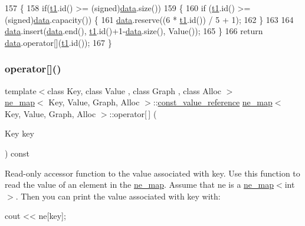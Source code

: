 \begin{DoxyCode}
157 \{
158     \textcolor{keywordflow}{if}(\mbox{\hyperlink{gml2nestedsql_8cpp_a214bd1a0500f5739ce581a8bcffb518a}{t1}}.id() >= (signed)\mbox{\hyperlink{classne__map_af73307678e05a9c24c084d98b267afa8}{data}}.size())
159     \{
160     \textcolor{keywordflow}{if} (\mbox{\hyperlink{gml2nestedsql_8cpp_a214bd1a0500f5739ce581a8bcffb518a}{t1}}.id() >= (signed)\mbox{\hyperlink{classne__map_af73307678e05a9c24c084d98b267afa8}{data}}.capacity()) \{
161         \mbox{\hyperlink{classne__map_af73307678e05a9c24c084d98b267afa8}{data}}.reserve((6 * \mbox{\hyperlink{gml2nestedsql_8cpp_a214bd1a0500f5739ce581a8bcffb518a}{t1}}.id()) / 5 + 1);
162     \}
163 
164     \mbox{\hyperlink{classne__map_af73307678e05a9c24c084d98b267afa8}{data}}.insert(\mbox{\hyperlink{classne__map_af73307678e05a9c24c084d98b267afa8}{data}}.end(), \mbox{\hyperlink{gml2nestedsql_8cpp_a214bd1a0500f5739ce581a8bcffb518a}{t1}}.id()+1-\mbox{\hyperlink{classne__map_af73307678e05a9c24c084d98b267afa8}{data}}.size(), Value());
165     \}
166     \textcolor{keywordflow}{return} \mbox{\hyperlink{classne__map_af73307678e05a9c24c084d98b267afa8}{data}}.operator[](\mbox{\hyperlink{gml2nestedsql_8cpp_a214bd1a0500f5739ce581a8bcffb518a}{t1}}.id());
167 \}
\end{DoxyCode}
\mbox{\label{classne__map_ad8d23cc924963ddff8267e625dcbffc6}} 
\subsubsection{\texorpdfstring{operator[]()}{operator[]()}\hspace{0.1cm}{\footnotesize\ttfamily [2/2]}}
{\footnotesize\ttfamily template$<$class Key, class Value , class Graph , class Alloc $>$ \\
\mbox{\hyperlink{classne__map}{ne\+\_\+map}}$<$ Key, Value, Graph, Alloc $>$\+::\mbox{\hyperlink{classne__map_ad2be1a01de53940aee1282ec0e34f0f7}{const\+\_\+value\+\_\+reference}} \mbox{\hyperlink{classne__map}{ne\+\_\+map}}$<$ Key, Value, Graph, Alloc $>$\+::operator\mbox{[}$\,$\mbox{]} (\begin{DoxyParamCaption}\item[{Key}]{key }\end{DoxyParamCaption}) const}

Read-\/only accessor function to the value associated with {\ttfamily key}. Use this function to read the value of an element in the {\ttfamily \mbox{\hyperlink{classne__map}{ne\+\_\+map}}}. Assume that {\ttfamily ne} is a {\ttfamily \mbox{\hyperlink{classne__map}{ne\+\_\+map}}$<$int$>$}. Then you can print the value associated with {\ttfamily key} with\+: 
\begin{DoxyPre}
  cout << ne[key];
\end{DoxyPre}



